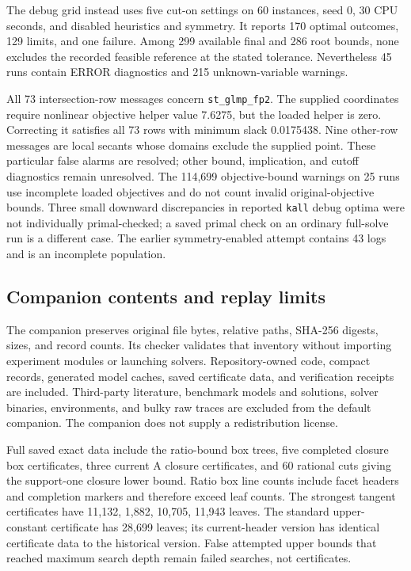 The debug grid instead uses five cut-on settings on 60 instances, seed 0,
30 CPU seconds, and disabled heuristics and symmetry. It reports 170
optimal outcomes, 129 limits, and one failure. Among 299 available final
and 286 root bounds, none excludes the recorded feasible reference at
the stated tolerance. Nevertheless 45 runs contain ERROR diagnostics
and 215 unknown-variable warnings.

All 73 intersection-row messages concern \texttt{st\_glmp\_fp2}.
The supplied coordinates require nonlinear objective helper value 7.6275,
but the loaded helper is zero. Correcting it satisfies all 73 rows with
minimum slack 0.0175438. Nine other-row messages are local secants whose
domains exclude the supplied point. These particular false alarms are
resolved; other bound, implication, and cutoff diagnostics remain
unresolved. The 114,699 objective-bound warnings on 25 runs use incomplete
loaded objectives and do not count invalid original-objective bounds.
Three small downward discrepancies in reported \texttt{kall} debug
optima were not individually primal-checked; a saved primal check on an
ordinary full-solve run is a different case. The earlier symmetry-enabled
attempt contains 43 logs and is an incomplete population.

\subsection{Companion contents and replay limits}
\label{exp:companion}

The companion preserves original file bytes, relative paths, SHA-256
digests, sizes, and record counts. Its checker validates that inventory
without importing experiment modules or launching solvers. Repository-owned
code, compact records, generated model caches, saved certificate data,
and verification receipts are included. Third-party literature, benchmark
models and solutions, solver binaries, environments, and bulky raw traces
are excluded from the default companion. The companion does not supply a redistribution license.

Full saved exact data include the ratio-bound box trees, five completed
closure box certificates, three current A closure certificates, and 60
rational cuts giving the support-one closure lower bound. Ratio box
line counts include facet headers and completion markers and therefore
exceed leaf counts. The strongest tangent certificates have 11,132,
1,882, 10,705, 11,943 leaves. The standard upper-constant certificate
has 28,699 leaves; its current-header version has identical certificate
data to the historical version. False attempted upper bounds that reached
maximum search depth remain failed searches, not certificates.

